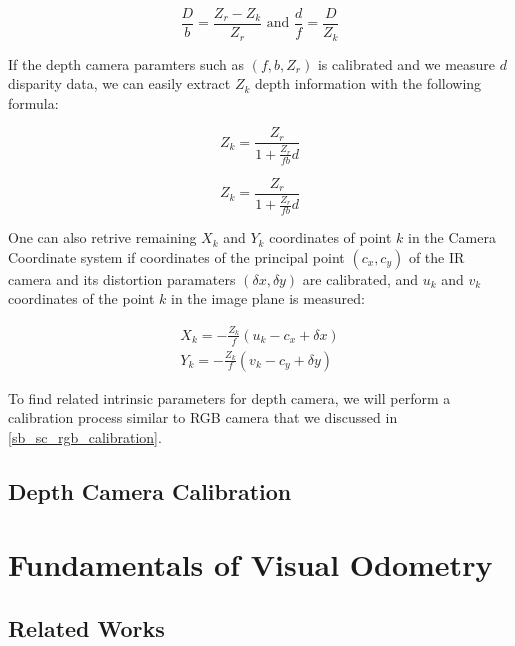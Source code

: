 \documentclass[a4paper]{report}
\numberwithin{figure}{section}
\begin{document}
\begin{equation}
  \frac{D}{b} = \frac{Z_r - Z_k}{Z_r} \text{ and } \frac{d}{f} = \frac{D}{Z_k}
\end{equation}

If the depth camera paramters such as $(f, b, Z_r)$ is 
calibrated and we measure $d$ disparity data, 
we can easily extract $Z_k$ depth information with the following formula:

\begin{equation}
  Z_k = \frac{Z_r}{1+\frac{Z_r}{fb}d}
\end{equation}



\begin{equation}
  Z_k = \frac{Z_r}{1+\frac{Z_r}{fb}d}
\end{equation}


One can also retrive remaining $X_k$ and $Y_k$ coordinates of point $k$ in the Camera 
Coordinate system if coordinates of the principal point $(c_x, c_y)$ of the 
IR camera and its distortion paramaters $(\delta x, \delta y)$ are calibrated, and 
$u_k$ and $v_k$ coordinates of the point $k$ in the image plane is measured:

\begin{equation}
\begin{aligned}
  X_k = -\frac{Z_k}{f} (u_k - c_x + \delta x)\\
  Y_k = -\frac{Z_k}{f} (v_k - c_y + \delta y)
\end{aligned}
\end{equation}

To find related intrinsic parameters for depth camera, we will perform 
a calibration process similar to RGB camera that we discussed in 
\ref{sb_sc_rgb_calibration}.


\section{Depth Camera Calibration} \label{sc_depth_camera_calibration}



\chapter{Fundamentals of Visual Odometry} \label{cp_vo}

\section{Related Works} \label{sc_visual_odometry_related_works}
\end{document}
